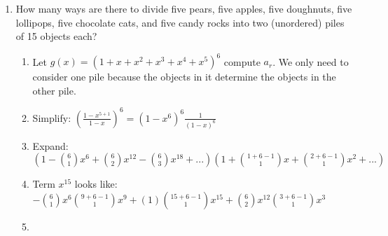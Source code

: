 \documentclass[12pt]{amsart}
\begin{document}
\begin{enumerate}
\item How many ways are there to divide five pears, five apples, five doughnuts, five
lollipops, five chocolate cats, and five candy rocks into two (unordered) piles of
15 objects each?
    \begin{enumerate}
        \item Let $g(x)=(1+x+x^2+x^3+x^4+x^5)^6$ compute $a_r$. We only need to consider one pile because the objects in it determine the objects in the other pile.
        \item Simplify: $(\frac{1-x^{5+1}}{1-x})^6=(1-x^6)^6\frac{1}{(1-x)^6}$
        \item Expand: $(1-\binom61x^6+\binom62x^{12}-\binom63x^{18}+...)(1+\binom{1+6-1}{1}x+\binom{2+6-1}{1}x^2+...)$
        \item Term $x^{15}$ looks like: $-\binom61x^6\binom{9+6-1}{1}x^9+(1)\binom{15+6-1}{1}x^{15}+\binom62x^{12}\binom{3+6-1}{1}x^3$
        \item {}
    \end{enumerate}
    
\end{enumerate}
\end{document}
